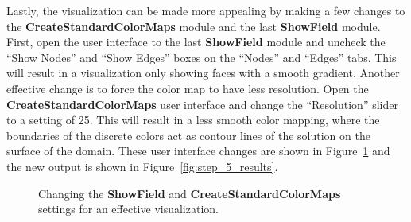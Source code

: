 \documentclass[fleqn,11pt,openany]{book}
\begin{document}
Lastly, the visualization can be made more appealing by making a few
changes to the {\bf CreateStandardColorMaps} module and the last {\bf
ShowField} module. First, open the user interface to the last {\bf
ShowField} module and uncheck the ``Show Nodes'' and ``Show Edges''
boxes on the ``Nodes'' and ``Edges'' tabs. This will result in a
visualization only showing faces with a smooth gradient. Another
effective change is to force the color map to have less resolution.
Open the {\bf CreateStandardColorMaps} user interface and change the
``Resolution'' slider to a setting of 25. This will result in a less
smooth color mapping, where the boundaries of the discrete colors act
as contour lines of the solution on the surface of the domain. These
user interface changes are shown in
Figure~\ref{fig:network_5_view_settings} and the new output is shown
in Figure~\ref{fig:step_5_results}.

\begin{figure}
\caption{Changing the {\bf ShowField} and {\bf
CreateStandardColorMaps} settings for an effective
visualization.}\label{fig:network_5_view_settings}
\end{figure}
\end{document}
